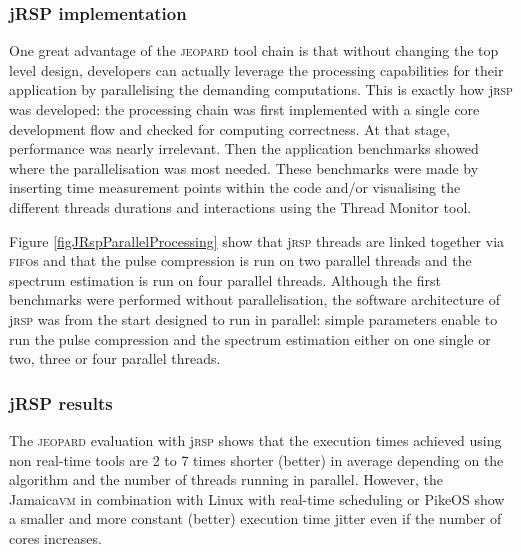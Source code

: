 \documentclass{sig-alternate}
\newcommand{\acronym}[1]{\textsc{#1}}
\begin{document}
\subsubsection{jRSP implementation}
 
One great advantage of the \acronym{jeopard} tool chain is that without changing the top level design, developers can actually leverage the processing capabilities for their application by parallelising the demanding computations. This is exactly how j\acronym{rsp} was developed: the processing chain was first implemented with a single core development flow and checked for computing correctness. At that stage, performance was nearly irrelevant. Then the application benchmarks showed where the parallelisation was most needed. These benchmarks were made by inserting time measurement points within the code and/or visualising the different threads durations and interactions using the Thread Monitor tool.

Figure \ref{figJRspParallelProcessing} show that j\acronym{rsp} threads are linked together via \acronym{fifo}s and that the pulse compression is run on two parallel threads and the spectrum estimation is run on four parallel threads. Although the first benchmarks were performed without parallelisation, the software architecture of j\acronym{rsp} was from the start designed to run in parallel: simple parameters enable to run the pulse compression and the spectrum estimation either on one single or two, three or four parallel threads.

\subsubsection{jRSP results}

The \acronym{jeopard} evaluation with j\acronym{rsp} shows that the execution times achieved using non real-time tools are 2 to 7 times shorter (better) in average depending on the algorithm and the number of threads running in parallel. However, the Jamaica\acronym{vm} in combination with Linux with real-time scheduling or PikeOS show a smaller and more constant (better) execution time jitter even if the number of cores increases. 
\end{document}
